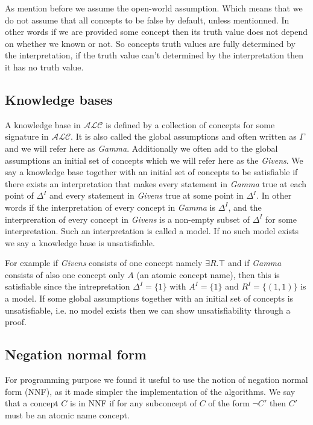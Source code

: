 As mention before we assume the open-world assumption. Which means
that we do not assume that all concepts to be false by default, unless
mentionned. In other words if we are provided some concept then its
truth value does not depend on whether we known or not. So concepts
truth values are fully determined by the interpretation, if the 
truth value can't determined by the interpretation then it has no
truth value.

\subsection{Knowledge bases}

A knowledge base in $\mathcal{ALC}$ is defined by a collection of
concepts for some signature in $\mathcal{ALC}$. It is also called the
global assumptions and often written as $\Gamma$ and we will refer
here as \textit{Gamma}. Additionally we often add to the global
assumptions an initial set of concepts which we will refer here as
the \textit{Givens}. We say a knowledge base together with an initial
set of concepts to be satisfiable if there exists an interpretation
that makes every statement in \textit{Gamma} true at each point of
$\Delta^{I}$ and every statement in \textit{Givens} true at some point
in $\Delta^{I}$. In other words if the interpretation of every concept
in \textit{Gamma} is $\Delta^{I}$, and the interpreration of every
concept in \textit{Givens} is a non-empty subset of $\Delta^{I}$ for
some interpretation. Such an interpretation is called a model.  If no
such model exists we say a knowledge base is unsatisfiable.

For example if \textit{Givens} consists of one concept namely $\exists
R. \top$ and if \textit{Gamma} consists of also one concept only $A$
(an atomic concept name), then this is satisfiable since the
intrepretation $\Delta^{I} = \{1\}$ with $A^{I} = \{1\}$ and $R^{I}
= \{(1,1)\}$ is a model. If some global assumptions together with an
initial set of concepts is unsatisfiable, i.e. no model exists then we
can show unsatisfiability through a proof.

\subsection{Negation normal form}

For programming purpose we found it useful to use the notion of
negation normal form (NNF), as it made simpler the implementation of
the algorithms. We say that a concept $C$ is in NNF if for any
subconcept of $C$ of the form $\neg C'$ then $C'$ must be an atomic
name concept.

